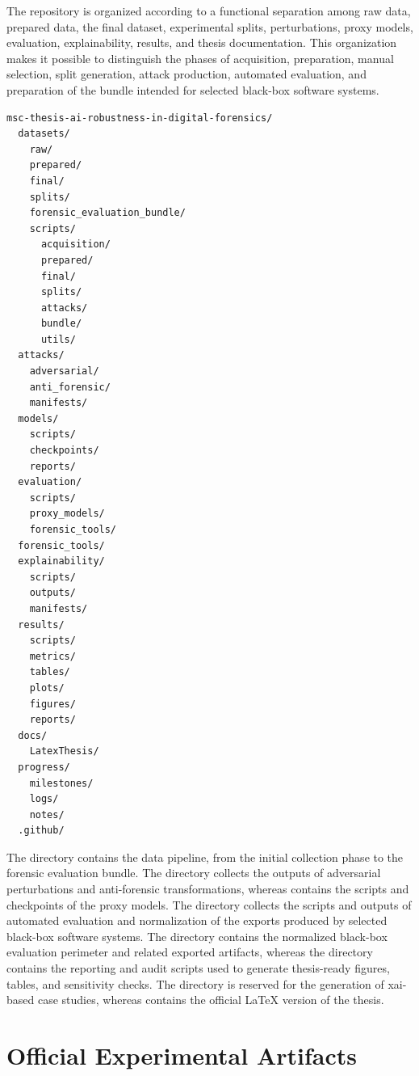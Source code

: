 The repository is organized according to a functional separation among raw data,
prepared data, the final dataset, experimental splits, perturbations, proxy
models, evaluation, explainability, results, and thesis documentation. This
organization makes it possible to distinguish the phases of acquisition,
preparation, manual selection, split generation, attack production, automated
evaluation, and preparation of the bundle intended for selected black-box
software systems.

\begin{lstlisting}[caption={Simplified structure of the experimental repository.}, label={lst:repository-structure}]
msc-thesis-ai-robustness-in-digital-forensics/
  datasets/
    raw/
    prepared/
    final/
    splits/
    forensic_evaluation_bundle/
    scripts/
      acquisition/
      prepared/
      final/
      splits/
      attacks/
      bundle/
      utils/
  attacks/
    adversarial/
    anti_forensic/
    manifests/
  models/
    scripts/
    checkpoints/
    reports/
  evaluation/
    scripts/
    proxy_models/
    forensic_tools/
  forensic_tools/
  explainability/
    scripts/
    outputs/
    manifests/
  results/
    scripts/
    metrics/
    tables/
    plots/
    figures/
    reports/
  docs/
    LatexThesis/
  progress/
    milestones/
    logs/
    notes/
  .github/
\end{lstlisting}

The  directory contains the data pipeline, from the initial
collection phase to the forensic evaluation bundle. The 
directory collects the outputs of adversarial perturbations and anti-forensic
transformations, whereas  contains the scripts and checkpoints
of the proxy models. The  directory collects the scripts
and outputs of automated evaluation and normalization of the exports produced by
selected black-box software systems. The  directory
contains the normalized black-box evaluation perimeter and related exported
artifacts, whereas the  directory contains the
reporting and audit scripts used to generate thesis-ready figures, tables, and
sensitivity checks. The  directory is reserved for the
generation of \gls{xai}-based case studies, whereas
 contains the official LaTeX version of the thesis.


\section{Official Experimental Artifacts}
\label{app:official-experimental-artifacts}

